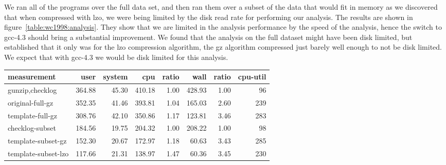 We ran all of the programs over the full data set, and then ran them
over a subset of the data that would fit in memory as we discovered
that when compressed with lzo, we were being limited by the disk read
rate for performing our analysis.  The results are shown in
figure~\ref{table:wc1998:analysis}.  They show that we are limited in
the analysis performance by the speed of the analysis, hence the
switch to gcc-4.3 should bring a substantial improvement.  We found
that the analysis on the full dataset might have been disk limited,
but established that it only was for the lzo compression algorithm,
the gz algorithm compressed just barely well enough to not be disk
limited.  We expect that with gcc-4.3 we would be disk limited for
this analysis.

\begin{table*}
\centering
\begin{tabular}{|l|r|r|r|r|r|r|r|}
\hline
measurement         & user & system  & cpu    & ratio & wall   & ratio & cpu-util \\
\hline
gunzip,checklog    & 364.88 & 45.30 & 410.18 & 1.00 & 428.93 & 1.00 &  96 \\
original-full-gz    & 352.35 & 41.46 & 393.81 & 1.04 & 165.03 & 2.60 & 239 \\
template-full-gz    & 308.76 & 42.10 & 350.86 & 1.17 & 123.81 & 3.46 & 283 \\
\hline
checklog-subset     & 184.56 & 19.75 & 204.32 & 1.00 & 208.22 & 1.00 &  98 \\
template-subset-gz  & 152.30 & 20.67 & 172.97 & 1.18 &  60.63 & 3.43 & 285 \\
template-subset-lzo & 117.66 & 21.31 & 138.97 & 1.47 &  60.36 & 3.45 & 230 \\
\hline
\end{tabular}

\caption{
Performance measurements over the full world cup dataset, or a 
subset of the data (files matching wc\_day$[12345]*$).  The dramatic
wall clock time improvement between the original and template version
shows that we are being limited by analysis performance.  This
observation is repeated by the complete lack of wall clock time
improvement shown by switching to the lzo decompression algorithm.
Measurements using the lzo compression algorithm on the full dataset
were slower because we were limited by the disk read performance, and
so were not further measured.  All measurements were taken with
1million byte extent sizes to match the sizes use in the compression
comparison.
}

\label{table:wc1998:analysis}
\end{table*}
